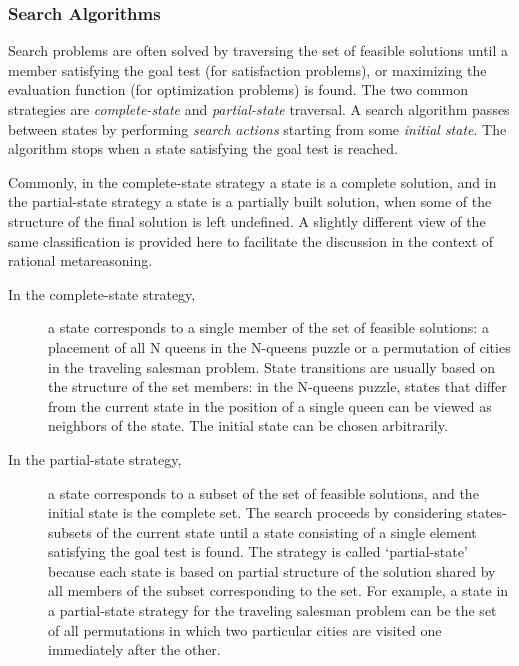\subsubsection{Search Algorithms}

Search problems are often solved by traversing the set of
feasible solutions until a member satisfying the goal test (for
satisfaction problems), or maximizing the evaluation function (for
optimization problems) is found. The two common strategies
are {\em complete-state} and {\em partial-state} traversal. A search
algorithm passes between states by performing {\em search actions}
starting from some {\em initial state}. The algorithm stops when a
state satisfying the goal test is reached.

Commonly, in the complete-state strategy a state is a complete
solution, and in the partial-state strategy a state is a
partially built solution, when some of the structure of the final
solution is left undefined. A slightly different view of the same
classification is provided here to facilitate the discussion in the
context of rational metareasoning.

\begin{description}
\item[In the complete-state strategy,] a state corresponds to a single
  member of the set of feasible solutions: a  placement
  of all N queens in the N-queens puzzle or a permutation of cities in the
  traveling salesman problem. State transitions are usually based on
  the structure of the set members: in the N-queens puzzle, states
  that differ from the current state in the position of a single queen can
  be viewed as neighbors of the state. The initial state can be
  chosen arbitrarily.

\item[In the partial-state strategy,] a state corresponds to a subset
  of the set of feasible solutions, and the initial state is the
 complete set. The search proceeds by considering states-subsets of
  the current state until a state consisting of a single element
  satisfying the goal test is found. The strategy is called
  `partial-state' because each state is based on partial structure of
  the solution shared by all members of the subset corresponding to
  the set. For example, a state in a partial-state strategy for the
  traveling salesman problem can be the set of all permutations in
  which two particular cities are visited one immediately after the
  other.
\end{description}

